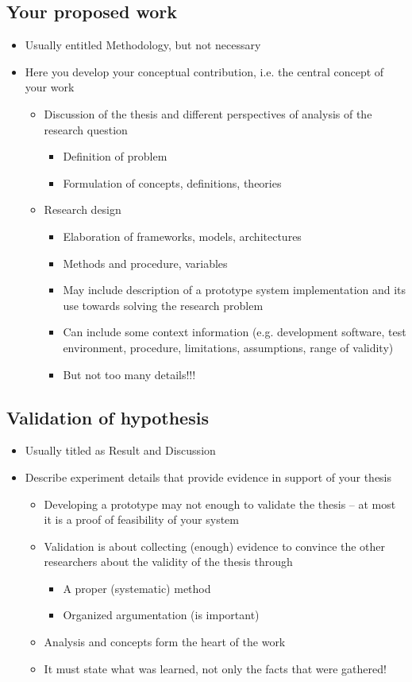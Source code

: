 \documentclass[oneside]{utmthesis}
\begin{document}
\subsection{Your proposed work}
\begin{itemize}
\item Usually entitled Methodology, but not necessary
\item Here you develop your conceptual contribution, i.e. the central concept
of your work
\begin{itemize}
\item Discussion of the thesis and different perspectives of analysis of
the research question
\begin{itemize}
\item Definition of problem
\item Formulation of concepts, definitions, theories
\end{itemize}
\item Research design
\begin{itemize}
\item Elaboration of frameworks, models, architectures
\item Methods and procedure, variables
\item May include description of a prototype system implementation and its
use towards solving the research problem 
\item Can include some context information (e.g. development software, test
environment, procedure, limitations, assumptions, range of validity)
\item But not too many details!!!
\end{itemize}
\end{itemize}
\end{itemize}

\subsection{Validation of hypothesis}
\begin{itemize}
\item Usually titled as Result and Discussion
\item Describe experiment details that provide evidence in support of your
thesis
\begin{itemize}
\item Developing a prototype may not enough to validate the thesis -- at
most it is a proof of feasibility of your system
\item Validation is about collecting (enough) evidence to convince the other
researchers about the validity of the thesis through
\begin{itemize}
\item A proper (systematic) method
\item Organized argumentation (is important)
\end{itemize}
\item Analysis and concepts form the heart of the work
\item It must state what was learned, not only the facts that were gathered! 
\end{itemize}
\end{itemize}
\end{document}
